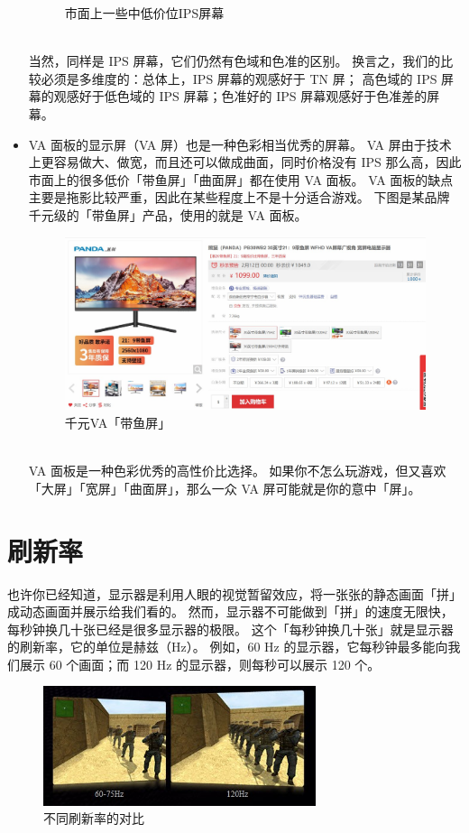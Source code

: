\begin{itemize}
\begin{figure}[htb!]
      \caption{市面上一些中低价位IPS屏幕}
      \label{IPS_at_Low_Price}
    \end{figure}\\
    当然，同样是 IPS 屏幕，它们仍然有色域和色准的区别。
    换言之，我们的比较必须是多维度的：总体上，IPS 屏幕的观感好于 TN 屏；
    高色域的 IPS 屏幕的观感好于低色域的 IPS 屏幕；色准好的 IPS 屏幕观感好于色准差的屏幕。
  \item VA 面板的显示屏（VA 屏）也是一种色彩相当优秀的屏幕。
    VA 屏由于技术上更容易做大、做宽，而且还可以做成曲面，同时价格没有 IPS 那么高，因此市面上的很多低价「带鱼屏」「曲面屏」都在使用 VA 面板。
    VA 面板的缺点主要是拖影比较严重，因此在某些程度上不是十分适合游戏。
    下图是某品牌千元级的「带鱼屏」产品，使用的就是 VA 面板。
    \begin{figure}[htb!]
      \centering
      \includegraphics[width=11cm]{assets/VA_at_Low_Price.jpg}
      \caption{千元VA「带鱼屏」}
      \label{VA_at_Low_Price}
    \end{figure}\\
    VA 面板是一种色彩优秀的高性价比选择。
    如果你不怎么玩游戏，但又喜欢「大屏」「宽屏」「曲面屏」，那么一众 VA 屏可能就是你的意中「屏」。
\end{itemize}

\section{刷新率}

也许你已经知道，显示器是利用人眼的视觉暂留效应，将一张张的静态画面「拼」成动态画面并展示给我们看的。
然而，显示器不可能做到「拼」的速度无限快，每秒钟换几十张已经是很多显示器的极限。
这个「每秒钟换几十张」就是显示器的刷新率，它的单位是赫兹（Hz）。
例如，60 Hz 的显示器，它每秒钟最多能向我们展示 60 个画面；而 120 Hz 的显示器，则每秒可以展示 120 个。

\begin{figure}[htb!]
  \centering
  \includegraphics[width=8cm]{assets/60Hz_vs_120Hz.jpg}
  \caption{不同刷新率的对比}
  \label{60Hz_vs_120Hz}
\end{figure}

